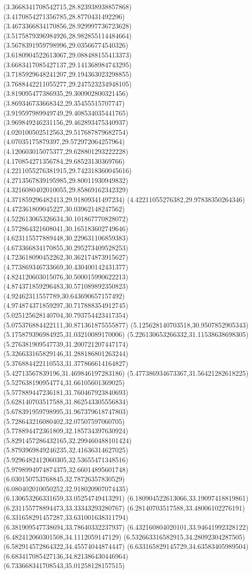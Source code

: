 {(3.3668341708542715,28.823938938857868)
(3.4170854271356785,28.8770431492296)
(3.4673366834170856,28.929997736723628)
(3.5175879396984926,28.982855114484664)
(3.5678391959798996,29.03566774540326)
(3.6180904522613067,29.088488155413373)
(3.6683417085427137,29.141368984743295)
(3.7185929648241207,29.194363023298855)
(3.7688442211055277,29.247523234948105)
(3.819095477386935,29.300902800321456)
(3.869346733668342,29.35455515707747)
(3.919597989949749,29.408534035441765)
(3.969849246231156,29.462893475340937)
(4.020100502512563,29.517687879682754)
(4.07035175879397,29.572972064257964)
(4.120603015075377,29.628801293222228)
(4.170854271356784,29.68523130369766)
(4.2211055276381915,29.742318360045616)
(4.2713567839195985,29.80011930949832)
(4.3216080402010055,29.85869162342329)
(4.371859296482413,29.91809341497234)
(4.42211055276382,29.97838350264346)
(4.472361809045227,30.03962148247562)
(4.522613065326634,30.101867770828072)
(4.572864321608041,30.165183602749646)
(4.623115577889448,30.229631106859383)
(4.673366834170855,30.295273409528253)
(4.723618090452262,30.362174873915627)
(4.773869346733669,30.430400142431377)
(4.824120603015076,30.500015990622213)
(4.874371859296483,30.571089892350823)
(4.92462311557789,30.643690657157492)
(4.974874371859297,30.717888354912745)
(5.025125628140704,30.793754423417354)
(5.075376884422111,30.871361875555877)
(5.125628140703518,30.9507852905343)
(5.175879396984925,31.03210089170006)
(5.226130653266332,31.11538638698305)
(5.276381909547739,31.200721207447174)
(5.326633165829146,31.288186801263244)
(5.376884422110553,31.377866614164827)
(5.42713567839196,31.469846197283186)
(5.477386934673367,31.56421282618225)
(5.527638190954774,31.66105601369025)
(5.577889447236181,31.760467923840693)
(5.628140703517588,31.862543305556834)
(5.678391959798995,31.967379618747803)
(5.728643216080402,32.07507597060705)
(5.778894472361809,32.185734397630924)
(5.8291457286432165,32.299460488101424)
(5.8793969849246235,32.41636314627025)
(5.9296482412060305,32.53655471348516)
(5.9798994974874375,32.66014895601748)
(6.030150753768845,32.78726357830529)
(6.080402010050252,32.918020907074435)
(6.130653266331659,33.05254749413291)
(6.180904522613066,33.19097418819861)
(6.231155778894473,33.33343293280767)
(6.28140703517588,33.48006102276191)
(6.331658291457287,33.631001638311794)
(6.381909547738694,33.78640332237937)
(6.432160804020101,33.94641992328122)
(6.482412060301508,34.1112059147129)
(6.532663316582915,34.28092304287505)
(6.582914572864322,34.45574044874447)
(6.633165829145729,34.63583405989504)
(6.683417085427136,34.821386430446964)
(6.733668341708543,35.01258128157515)
}

